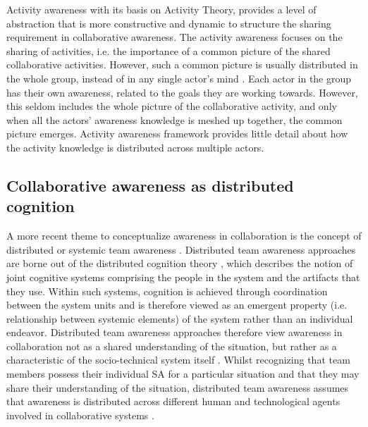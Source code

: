 Activity awareness with its basis on Activity Theory, provides a level of abstraction that is more constructive and dynamic to structure the sharing requirement in collaborative awareness. The activity awareness focuses on the sharing of activities, i.e. the importance of a common picture of the shared collaborative activities. However, such a common picture is usually distributed in the whole group, instead of in any single actor's mind \cite{Stanton2009}. Each actor in the group has their own awareness, related to the goals they are working towards. However, this seldom includes the whole picture of the collaborative activity, and only when all the actors' awareness knowledge is meshed up together, the common picture emerges. Activity awareness framework provides little detail about how the activity knowledge is distributed across multiple actors.

\subsection{Collaborative awareness as distributed cognition} %
\label{sub:distributed_team_awareness}
A more recent theme to conceptualize awareness in collaboration is the concept of distributed or systemic team awareness \cite{Stanton2009,artman1998situation}. Distributed team awareness approaches are borne out of the distributed cognition theory \cite{hutchins1995cognition}, which describes the notion of joint cognitive systems comprising the people in the system and the artifacts that they use. Within such systems, cognition is achieved through coordination between the system units \cite{artman1998situation} and is therefore viewed as an emergent property (i.e. relationship between systemic elements) of the system rather than an individual endeavor. Distributed team awareness approaches therefore view awareness in collaboration not as a shared understanding of the situation, but rather as a characteristic of the socio-technical system itself \cite{artman1998situation}. Whilst recognizing that team members possess their individual SA for a particular situation and that they may share their understanding of the situation, distributed team awareness assumes that awareness is distributed across different human and technological agents involved in collaborative systems \cite{Stanton2009}.

